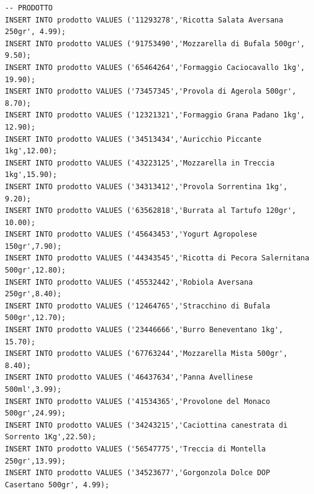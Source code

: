 \documentclass[12pt]{report}
\begin{document}
\begin{scriptsize}
\begin{verbatim}
-- PRODOTTO
INSERT INTO prodotto VALUES ('11293278','Ricotta Salata Aversana 250gr', 4.99);
INSERT INTO prodotto VALUES ('91753490','Mozzarella di Bufala 500gr', 9.50);
INSERT INTO prodotto VALUES ('65464264','Formaggio Caciocavallo 1kg', 19.90);
INSERT INTO prodotto VALUES ('73457345','Provola di Agerola 500gr', 8.70);
INSERT INTO prodotto VALUES ('12321321','Formaggio Grana Padano 1kg', 12.90);
INSERT INTO prodotto VALUES ('34513434','Auricchio Piccante 1kg',12.00);
INSERT INTO prodotto VALUES ('43223125','Mozzarella in Treccia 1kg',15.90);
INSERT INTO prodotto VALUES ('34313412','Provola Sorrentina 1kg', 9.20);
INSERT INTO prodotto VALUES ('63562818','Burrata al Tartufo 120gr', 10.00);
INSERT INTO prodotto VALUES ('45643453','Yogurt Agropolese 150gr',7.90);
INSERT INTO prodotto VALUES ('44343545','Ricotta di Pecora Salernitana 500gr',12.80);
INSERT INTO prodotto VALUES ('45532442','Robiola Aversana 250gr',8.40);
INSERT INTO prodotto VALUES ('12464765','Stracchino di Bufala 500gr',12.70);
INSERT INTO prodotto VALUES ('23446666','Burro Beneventano 1kg', 15.70);
INSERT INTO prodotto VALUES ('67763244','Mozzarella Mista 500gr', 8.40);
INSERT INTO prodotto VALUES ('46437634','Panna Avellinese 500ml',3.99);
INSERT INTO prodotto VALUES ('41534365','Provolone del Monaco 500gr',24.99);
INSERT INTO prodotto VALUES ('34243215','Caciottina canestrata di Sorrento 1Kg',22.50);
INSERT INTO prodotto VALUES ('56547775','Treccia di Montella 250gr',13.99);
INSERT INTO prodotto VALUES ('34523677','Gorgonzola Dolce DOP Casertano 500gr', 4.99);


\end{verbatim}
\end{scriptsize}
\end{document}
